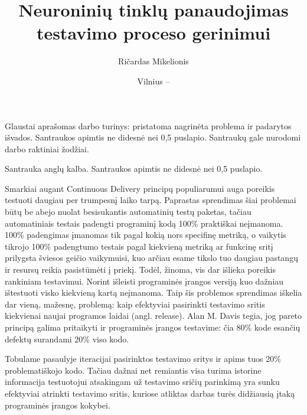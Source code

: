 \documentclass{VUMIFPSbakalaurinis}
\title{Neuroninių tinklų panaudojimas testavimo proceso gerinimui}
\author{Ričardas Mikelionis}
\date{Vilnius – \the\year}
\begin{document}
\maketitle


Glaustai aprašomas darbo turinys: pristatoma nagrinėta problema ir padarytos
išvados. Santraukos apimtis ne didesnė nei 0,5 puslapio. Santraukų gale
nurodomi darbo raktiniai žodžiai. 

Santrauka anglų kalba. Santraukos apimtis ne didesnė nei 0,5 puslapio.

\tableofcontents

Smarkiai augant Continuous Delivery principų populiarumui auga poreikis testuoti daugiau per trumpesnį laiko tarpą. Paprastas sprendimas šiai problemai būtų be abejo nuolat besisukantis automatinių testų paketas, tačiau automatiniais testais padengti programinį kodą 100\% praktiškai neįmanoma. 100\% padengimas įmanomas tik pagal kokią nors specifinę metriką, o vaikytis tikrojo 100\% padengtumo testais pagal kiekvieną metriką ar funkcinę sritį prilygsta šviesos geičio vaikymuisi, kuo arčiau esame tikslo tuo daugiau pastangų ir resursų reikia pasistūmėti į priekį. Todėl, žinoma, vis dar išlieka poreikis rankiniam testavimui. Norint išleisti programinės įrangos versiją kuo dažniau ištestuoti visko kiekvieną kartą neįmanoma. Taip šis problemos sprendimas iškelia dar vieną, mažesnę, problemą: kaip efektyviai pasirinkti testavimo sritis kiekvienai naujai programos laidai (angl. release). Alan M. Davis \cite{Davis:1995:PSD:203406} tegia, jog pareto principą galima pritaikyti ir programinės įrangos testavime: čia 80\% kode esančių defektų surandami 20\% viso kodo.

Tobulame pasaulyje iteracijai pasirinktos testavimo sritys ir apims tuos 20\% problematiškojo kodo. Tačiau dažnai net remiantis visa turima istorine informacija testuotojui atsakingam už testavimo sričių parinkimą yra sunku efektyviai atrinkti testavimo sritis, kuriose atliktas darbas turės didžiausią įtaką programinės įrangos kokybei.
\end{document}

